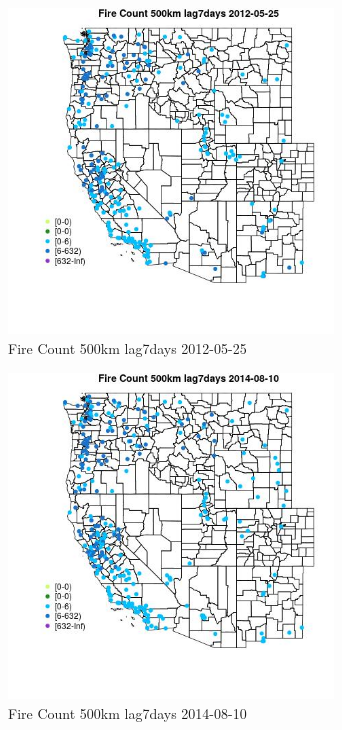 \begin{figure} 
\centering  
\includegraphics[width=0.77\textwidth]{Code_Outputs/Report_ML_input_PM25_Step4_part_e_de_duplicated_aves_compiled_2019-05-18wNAs_MapObsFire_Count_500km_lag7days2012-05-25.jpg} 
\caption{\label{fig:Report_ML_input_PM25_Step4_part_e_de_duplicated_aves_compiled_2019-05-18wNAsMapObsFire_Count_500km_lag7days2012-05-25}Fire Count 500km lag7days 2012-05-25} 
\end{figure} 
 

\begin{figure} 
\centering  
\includegraphics[width=0.77\textwidth]{Code_Outputs/Report_ML_input_PM25_Step4_part_e_de_duplicated_aves_compiled_2019-05-18wNAs_MapObsFire_Count_500km_lag7days2014-08-10.jpg} 
\caption{\label{fig:Report_ML_input_PM25_Step4_part_e_de_duplicated_aves_compiled_2019-05-18wNAsMapObsFire_Count_500km_lag7days2014-08-10}Fire Count 500km lag7days 2014-08-10} 
\end{figure} 
 

